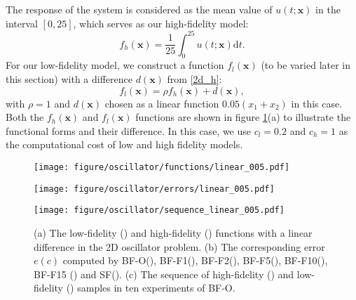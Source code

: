 \documentclass[11pt]{article}
\begin{document}
The response of the system is considered as the mean value of $u(t;\mathbf{x})$ in the interval $[0,25]$, which serves as our high-fidelity model:
\begin{equation}
    f_h(\mathbf{x}) = \frac{1}{25} \int_{0}^{25}u(t;\mathbf{x}) \mathrm{d} t.
\label{2d_h}
\end{equation}
For our low-fidelity model, we construct a function $f_l(\mathbf{x})$ (to be varied later in this section) with a difference $d(\mathbf{x})$ from \eqref{2d_h}:
\begin{equation}
    f_l(\mathbf{x}) = \rho f_h(\mathbf{x}) + d(\mathbf{x}),
\label{2d_low}
\end{equation}
with $\rho=1$ and $d(\mathbf{x})$ chosen as a linear function $0.05 (x_1 + x_2)$ in this case. Both the $f_h(\mathbf{x})$ and $f_l(\mathbf{x})$ functions are shown in figure \ref{fig:os_linear}(a) to illustrate the functional forms and their difference. In this case, we use $c_l=0.2$ and $c_h=1$ as the computational cost of low and high fidelity models.

\begin{figure}
\centering
\begin{minipage}[b]{0.47\linewidth}
\texttt{[image: figure/oscillator/functions/linear\_005.pdf]}
\end{minipage}
\begin{minipage}[b]{0.49\linewidth}
\texttt{[image: figure/oscillator/errors/linear\_005.pdf]}
\end{minipage}
\begin{minipage}[b]{\linewidth}
\centering
\quad \quad
\texttt{[image: figure/oscillator/sequence\_linear\_005.pdf]}
\\ 
\end{minipage}
\caption{(a) The low-fidelity (\redline) and high-fidelity (\blackline) functions with a linear difference in the 2D oscillator problem. (b) The corresponding error $e(c)$ computed by BF-O(\blackline), BF-F1(\orangedashedline), BF-F2(\greendashedline), BF-F5(\reddashedline), BF-F10(\purpledashedline), BF-F15 (\browndashedline) and SF(\blueline). (c) The sequence of high-fidelity () and low-fidelity () samples in ten experiments of BF-O.}
\label{fig:os_linear}
\end{figure}
\end{document}
